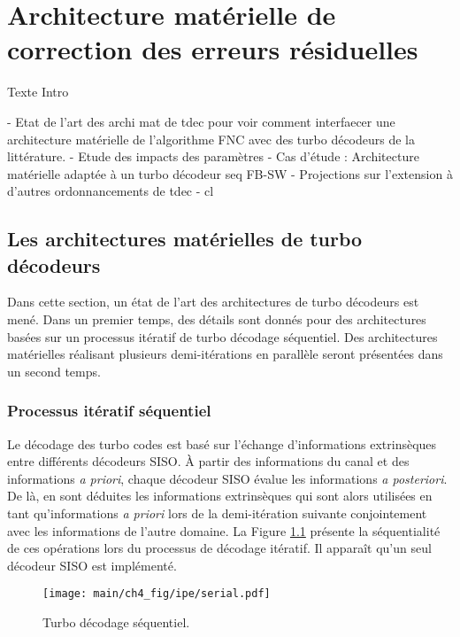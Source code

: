 \chapter{Architecture matérielle de correction des erreurs résiduelles}

Texte Intro

- Etat de l'art des archi mat de tdec pour voir comment interfaecer une architecture matérielle de l'algorithme FNC avec
des turbo décodeurs de la littérature.
- Etude des impacts des paramètres
- Cas d'étude : Architecture matérielle adaptée à un turbo décodeur seq FB-SW
- Projections sur l'extension à d'autres ordonnancements de tdec
- cl
\vspace*{\fill}
\minitocTITI
\vspace*{\fill}
\newpage

\section{Les architectures matérielles de turbo décodeurs}
Dans cette section, un état de l'art des architectures de turbo décodeurs est mené. Dans un premier temps, des détails 
sont donnés pour des architectures basées sur un processus itératif de turbo décodage séquentiel. Des architectures 
matérielles réalisant plusieurs demi-itérations en parallèle seront présentées dans un second temps.

\subsection{Processus itératif séquentiel}
Le décodage des turbo codes est basé sur l'échange d'informations extrinsèques entre différents décodeurs SISO. À partir 
des informations du canal et des informations \textit{a priori}, chaque décodeur SISO évalue les informations 
\textit{a posteriori}. De là, en sont déduites les informations extrinsèques qui sont alors utilisées en tant
qu'informations \textit{a priori} lors de la demi-itération suivante conjointement avec les informations de l'autre
domaine. La Figure \ref{fig:turbo_seq} présente la séquentialité de ces opérations lors du processus de décodage
itératif. Il apparaît qu'un seul décodeur SISO est implémenté. 

\begin{figure}[!h]
	\centering
	\texttt{[image: main/ch4\_fig/ipe/serial.pdf]}
	\caption{Turbo décodage séquentiel. \label{fig:turbo_seq}}
\end{figure} 


